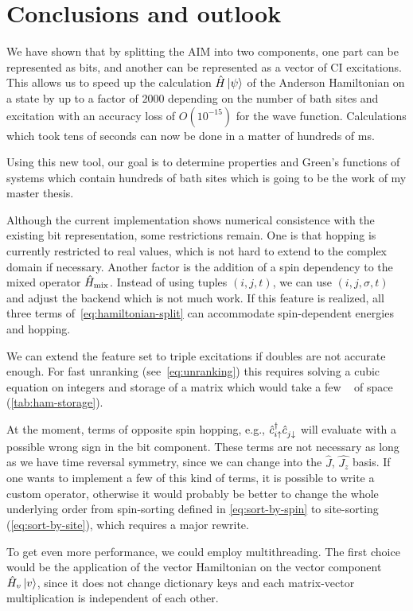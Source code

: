 \chapter{Conclusions and outlook}

We have shown that by splitting the AIM into two components,
one part can be represented as bits,
and another can be represented as a vector of CI excitations.
This allows us to speed up the calculation $\hat{H} \ket{\psi}$
of the Anderson Hamiltonian on a state by
up to a factor of 2000 depending on the number of bath sites and excitation
with an accuracy loss of $O(10^{-15})$ for the wave function.
Calculations which took tens of seconds can now be done in
a matter of hundreds of \unit{\milli\second}.

Using this new tool,
our goal is to determine properties and Green's functions of systems
which contain hundreds of bath sites which is going to be
the work of my master thesis.

Although the current implementation shows numerical consistence with the
existing bit representation,
some restrictions remain.
One is that hopping is currently restricted to real values,
which is not hard to extend to the complex domain if necessary.
Another factor is the addition of a spin dependency
to the mixed operator $\hat{H}_{\mathrm{mix}}$.
Instead of using tuples $(i, j, t)$,
we can use $(i, j, \sigma, t)$ and adjust the backend which is not much work.
If this feature is realized,
all three terms of~\cref{eq:hamiltonian-split}
can accommodate spin-dependent energies and hopping.

We can extend the feature set to triple excitations if doubles are not
accurate enough. For fast unranking (see~\cref{eq:unranking}) this
requires solving a cubic equation on integers and storage of a matrix
which would take a few \unit{\giga\byte} of space (\cref{tab:ham-storage}).

At the moment, terms of opposite spin hopping, e.g., $\cdag_{i\up}\cc_{j\dn}$
will evaluate with a possible wrong sign in the bit component.
These terms are not necessary as long as we have time reversal symmetry,
since we can change into the $\hat{J}$, $\hat{J_z}$ basis.
If one wants to implement a few of this kind of terms,
it is possible to write a custom operator,
otherwise it would probably be better to change the whole underlying order from
spin-sorting defined in \cref{eq:sort-by-spin} to site-sorting
(\cref{eq:sort-by-site}),
which requires a major rewrite.

To get even more performance,
we could employ multithreading.
The first choice would be the application
of the vector Hamiltonian on the vector component $\hat{H}_v \ket{v}$,
since it does not change dictionary keys
and each matrix-vector multiplication is independent of each other.
